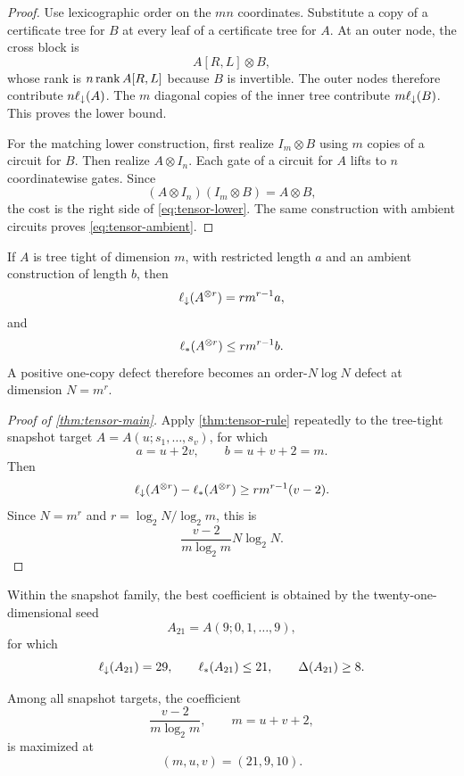 \begin{proof}
Use lexicographic order on the $mn$ coordinates.  Substitute a copy of a certificate tree for $B$ at every leaf of a certificate tree for $A$.  At an outer node, the cross block is
\[
A[R,L]\otimes B,
\]
whose rank is $n\operatorname{rank} A[R,L]$ because $B$ is invertible.  The outer nodes therefore contribute $n\ell_{\downarrow}(A)$.  The $m$ diagonal copies of the inner tree contribute $m\ell_{\downarrow}(B)$.  This proves the lower bound.

For the matching lower construction, first realize $I_m\otimes B$ using $m$ copies of a circuit for $B$.  Then realize $A\otimes I_n$.  Each gate of a circuit for $A$ lifts to $n$ coordinatewise gates.  Since
\[
(A\otimes I_n)(I_m\otimes B)=A\otimes B,
\]
the cost is the right side of \cref{eq:tensor-lower}.  The same construction with ambient circuits proves \cref{eq:tensor-ambient}.
\end{proof}

If $A$ is tree tight of dimension $m$, with restricted length $a$ and an ambient construction of length $b$, then
\begin{equation}\label{eq:tensor-power-lower}
\ell_{\downarrow}(A^{\otimes r})
=
r m^{r-1}a,
\end{equation}
and
\begin{equation}\label{eq:tensor-power-upper}
\ell_{*}(A^{\otimes r})
\le
r m^{r-1}b.
\end{equation}
A positive one-copy defect therefore becomes an order-$N\log N$ defect at dimension $N=m^r$.

\begin{proof}[Proof of \cref{thm:tensor-main}]
Apply \cref{thm:tensor-rule} repeatedly to the tree-tight snapshot target $A=A(u;s_1,\ldots,s_v)$, for which
\[
a=u+2v,
\qquad
b=u+v+2=m.
\]
Then
\[
\ell_{\downarrow}(A^{\otimes r})
-
\ell_{*}(A^{\otimes r})
\ge
r m^{r-1}(v-2).
\]
Since $N=m^r$ and $r=\log_2N/\log_2m$, this is
\[
\frac{v-2}{m\log_2m}N\log_2N.
\]
\end{proof}

Within the snapshot family, the best coefficient is obtained by the twenty-one-dimensional seed
\[
A_{21}=A(9;0,1,\ldots,9),
\]
for which
\[
\ell_{\downarrow}(A_{21})=29,
\qquad
\ell_{*}(A_{21})\le21,
\qquad
\Delta(A_{21})\ge8.
\]

\begin{proposition}\label{prop:optimal-snapshot-seed}
Among all snapshot targets, the coefficient
\[
\frac{v-2}{m\log_2m},
\qquad m=u+v+2,
\]
is maximized at
\[
(m,u,v)=(21,9,10).
\]
\end{proposition}

